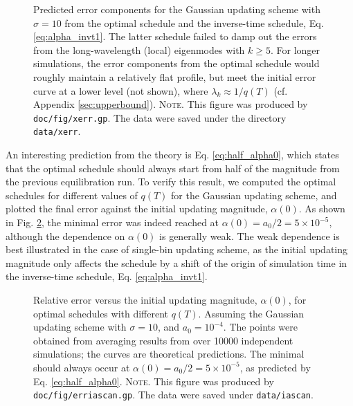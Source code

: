 \documentclass[reprint, superscriptaddress, floatfix]{revtex4-1}
\newcommand{\note}[1]{{\color{DarkGreen}\footnotesize \textsc{Note.} #1}}
\begin{document}
\begin{figure}[h]
\begin{center}
  \caption{
    \label{fig:xerr}
    Predicted error components for the Gaussian updating scheme
    with $\sigma = 10$
    from the optimal schedule
    and the inverse-time schedule, Eq. \eqref{eq:alpha_invt1}.
    The latter schedule failed to damp out the errors
    from the long-wavelength (local) eigenmodes
    with $k \ge 5$.
    For longer simulations,
    the error components from the optimal schedule
    would roughly maintain a relatively flat profile,
    but meet the initial error curve
    at a lower level (not shown),
    where $\lambda_k \approx 1/q(T)$
    (cf. Appendix \ref{sec:upperbound}).
    \note{This figure was produced by \texttt{doc/fig/xerr.gp}.
      The data were saved under the directory \texttt{data/xerr}.
    }%
  }
\end{center}
\end{figure}


An interesting prediction from the theory is Eq. \eqref{eq:half_alpha0},
which states that the optimal schedule should always start from
half of the magnitude from the previous equilibration run.
%
To verify this result,
we computed the optimal schedules
for different values of $q(T)$
for the Gaussian updating scheme,
and plotted the final error
against the initial updating magnitude, $\alpha(0)$.
%
As shown in Fig. \ref{fig:erriascan},
the minimal error was indeed reached at
$\alpha(0) = a_0/2 = 5 \times 10^{-5}$,
although the dependence on $\alpha(0)$
is generally weak.
%
The weak dependence is best illustrated in
the case of single-bin updating scheme,
as the initial updating magnitude only
affects the schedule by a shift of the origin of
simulation time in the inverse-time schedule,
Eq. \eqref{eq:alpha_invt1}.


\begin{figure}[h]
\begin{center}
  \caption{
    \label{fig:erriascan}
    Relative error
    versus the initial updating magnitude, $\alpha(0)$,
    for optimal schedules with different $q(T)$.
    Assuming the Gaussian updating scheme
    with $\sigma = 10$,
    and $a_0 = 10^{-4}$.
    The points were obtained from averaging results
    from over 10000 independent simulations;
    the curves are theoretical predictions.
    The minimal should always occur at
    $\alpha(0) = a_0/2 = 5 \times 10^{-5}$,
    as predicted by Eq. \eqref{eq:half_alpha0}.
    \note{This figure was produced by
      \texttt{doc/fig/erriascan.gp}.
      The data were saved under
      \texttt{data/iascan}.
    }%
  }
\end{center}
\end{figure}
\end{document}
